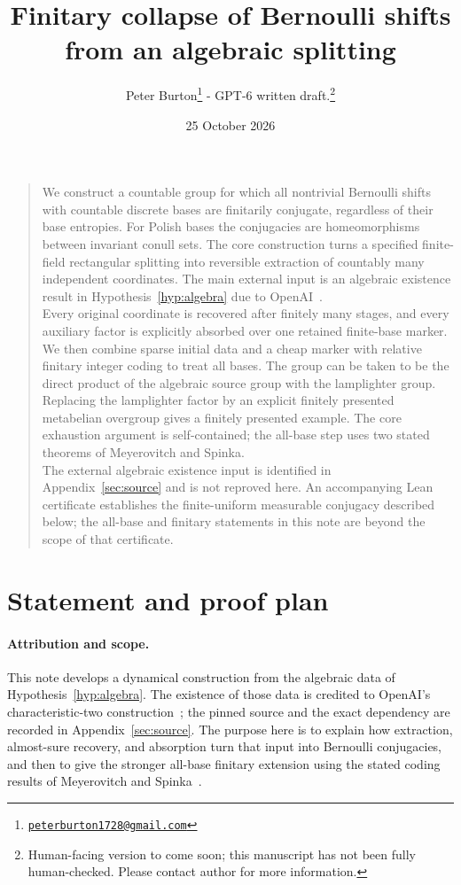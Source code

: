 \documentclass[11pt,a4paper]{article}
\title{Finitary collapse of Bernoulli shifts\\from an algebraic splitting}
\author{Peter Burton\thanks{\href{mailto:peterburton1728@gmail.com}{\texttt{peterburton1728@gmail.com}}} - GPT-6 written draft.\thanks{Human-facing version to come soon; this manuscript has not been fully human-checked. Please contact author for more information.}}
\date{25 October 2026}
\renewenvironment{abstract}
  {\begin{center}\Large\sffamily\bfseries\abstractname\end{center}\begin{quotation}\sffamily\normalsize\setlength{\parindent}{0pt}}
  {\end{quotation}}
\numberwithin{equation}{section}
\begin{document}
\maketitle
\begin{abstract}
We construct a countable group for
which all nontrivial Bernoulli shifts
with countable discrete bases are finitarily conjugate, regardless of
their base entropies. For Polish bases the conjugacies are homeomorphisms
between invariant conull sets. The core construction turns a specified
finite-field rectangular splitting into reversible extraction of
countably many independent coordinates. The main external input is an algebraic existence result in Hypothesis~\ref{hyp:algebra} due to
OpenAI~\cite{OAI}. \\

Every original coordinate is
recovered after finitely many stages, and every auxiliary factor is
explicitly absorbed over one retained finite-base marker. We then combine
sparse initial data and a cheap marker with relative finitary integer
coding to treat all bases. The group can be taken to be the direct product
of the algebraic source group with the lamplighter group. Replacing the
lamplighter factor by an explicit finitely presented metabelian overgroup
gives a finitely presented example.
The core exhaustion argument is self-contained;
the all-base step uses two stated theorems of Meyerovitch and Spinka.\\

The external algebraic existence input is identified in
Appendix~\ref{sec:source} and is not reproved here.
An accompanying Lean certificate establishes the finite-uniform measurable
conjugacy described below; the all-base and finitary statements in this
note are beyond the scope of that certificate.
\end{abstract}

\section{Statement and proof plan}

\paragraph{Attribution and scope.}
This note develops a dynamical construction from the algebraic data of
Hypothesis~\ref{hyp:algebra}. The existence of those data is credited to
OpenAI's characteristic-two construction~\cite{OAI}; the pinned source and
the exact dependency are recorded in Appendix~\ref{sec:source}.
The purpose here is to explain how extraction, almost-sure recovery, and
absorption turn that input into Bernoulli conjugacies, and then to give the
stronger all-base finitary extension using the stated coding results of
Meyerovitch and Spinka~\cite{MS}.
\end{document}
